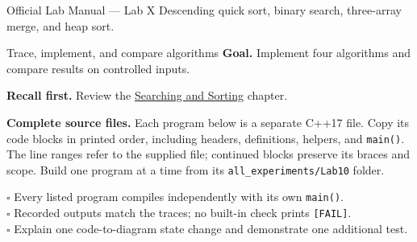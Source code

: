 
\begin{sourcealignment}{Official Lab Manual --- Lab X}
Descending quick sort, binary search, three-array merge, and heap sort.
\end{sourcealignment}

\begin{labproject}{Trace, implement, and compare algorithms}
\textbf{Goal.} Implement four algorithms and compare results on controlled inputs.

\textbf{Recall first.} Review the \hyperref[ch:search-sort]{Searching and Sorting} chapter.

\textbf{Complete source files.} Each program below is a separate C++17 file.
Copy its code blocks in printed order, including headers, definitions, helpers, and \texttt{main()}.
The line ranges refer to the supplied file; continued blocks preserve its braces and scope.
Build one program at a time from its \texttt{all\_experiments/Lab10} folder.



\tcbbreak


\tcbbreak


\tcbbreak

\end{labproject}

\begin{verification}
$\square$ Every listed program compiles independently with its own \texttt{main()}.\\
$\square$ Recorded outputs match the traces; no built-in check prints \texttt{[FAIL]}.\\
$\square$ Explain one code-to-diagram state change and demonstrate one additional test.
\end{verification}
